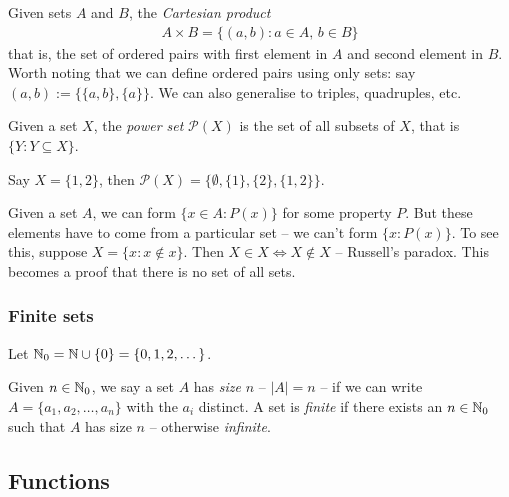 \documentclass{../../template/note}
\begin{document}
    \begin{definition}
        Given sets \(A\) and \(B\), the \emph{Cartesian product}
        \begin{align*}
            A \times B = \{(a, b): a \in A,\, b \in B\}
        \end{align*}
        that is, the set of ordered pairs with first element in \(A\) and second element in \(B\). Worth noting that we can define ordered pairs using only sets: say \((a, b) := \{\{a, b\}, \{a\}\}\). We can also generalise to triples, quadruples, etc.
        
    \end{definition}
    
    \begin{definition}
        Given a set \(X\), the \emph{power set} \(\mathcal P(X)\) is the set of all subsets of \(X\), that is \(\{Y: Y \subseteq X\}\).
    \end{definition}
    
    \begin{example}
        Say \(X = \{1, 2\}\), then \(\mathcal P(X) = \{\emptyset, \{1\}, \{2\}, \{1, 2\}\}\).
    \end{example}
    
    \begin{remark*}
        Given a set \(A\), we can form \(\{x \in A: P(x)\}\) for some property \(P\). But these elements have to come from a particular set -- we can't form \(\{x: P(x)\}\). To see this, suppose \(X = \{x: x \notin x\}\). Then \(X \in X \iff X \notin X\) -- Russell's paradox. This becomes a proof that there is no set of all sets.
    \end{remark*}
    
    \subsubsection{Finite sets}

    Let \(\mathbb N_0 = \mathbb N \cup \{0\} = \{0, 1, 2, \dots\}\). 

    \begin{definition}
        Given \(n \in \mathbb N_0\), we say a set \(A\) has \emph{size} \(n\) -- \(|A| = n\) -- if we can write \(A = \{a_1, a_2, \dots, a_n\}\) with the \(a_i\) distinct. A set is \emph{finite} if there exists an \(n \in \mathbb N_0\) such that \(A\) has size \(n\) -- otherwise \emph{infinite}.
    \end{definition}
    
    \subsection{Functions}
\end{document}
